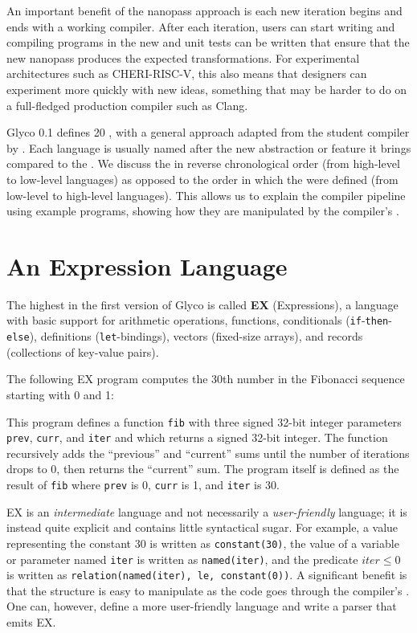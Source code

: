 \documentclass[main.tex]{subfiles}
\begin{document}
An important benefit of the nanopass approach is each new iteration begins and ends with a working compiler. After each iteration, users can start writing and compiling programs in the new  and unit tests can be written that ensure that the new \gls{nanopass} produces the expected transformations. For experimental architectures such as CHERI-RISC-V, this also means that designers can experiment more quickly with new ideas, something that may be harder to do on a full-fledged production compiler such as Clang.

Glyco 0.1 defines 20 , with a general approach adapted from the student compiler by \cite{compcourse}. Each language is usually named after the new abstraction or feature it brings compared to the . We discuss the  in reverse chronological order (from high-level to low-level languages) as opposed to the order in which the  were defined (from low-level to high-level languages). This allows us to explain the compiler pipeline using example programs, showing how they are manipulated by the compiler's .

\section{An Expression Language} \label{sct:ex}
The highest  in the first version of Glyco is called \textbf{EX} (Expressions), a language with basic support for arithmetic operations, functions, conditionals (\texttt{if}-\texttt{then}-\texttt{else}), definitions (\texttt{let}-bindings), vectors (fixed-size arrays), and records (collections of key-value pairs).

The following EX program computes the 30th number in the Fibonacci sequence starting with 0 and 1:

This program defines a function \texttt{fib} with three signed 32-bit integer parameters \texttt{prev}, \texttt{curr}, and \texttt{iter} and which returns a signed 32-bit integer. The function recursively adds the \enquote{previous} and \enquote{current} sums until the number of iterations drops to 0, then returns the \enquote{current} sum. The program itself is defined as the result of \texttt{fib} where \texttt{prev} is 0, \texttt{curr} is 1, and \texttt{iter} is 30.

EX is an \emph{intermediate} language and not necessarily a \emph{user-friendly} language; it is instead quite explicit and contains little syntactical sugar. For example, a value representing the constant 30 is written as \texttt{constant(30)}, the value of a variable or parameter named \texttt{iter} is written as \texttt{named(iter)}, and the predicate $ \textit{iter} \le 0 $ is written as \texttt{relation(named(iter), le, constant(0))}. A significant benefit is that the structure is easy to manipulate as the code goes through the compiler's . One can, however, define a more user-friendly language and write a parser that emits EX.
\end{document}
